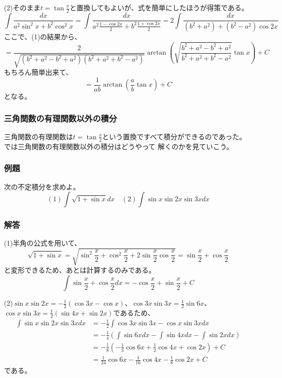 \documentclass[a4j,dvipdfmx]{jsarticle}
\begin{document}
(2)そのまま$t=\tan\frac{x}{2}$と置換してもよいが、式を簡単にしたほうが得策である。
\begin{equation*}
    \int \frac{dx}{a^2\sin^2 x+b^2\cos^2 x}=\int\frac{dx}{a^2\frac{1-\cos 2x}{2}+b^2\frac{1+\cos 2x}{2}}=2\int\frac{dx}{(b^2+a^2)+(b^2-a^2)\cos2x}
\end{equation*}
ここで、(1)の結果から、
\begin{equation*}
    =\frac{2}{\sqrt{(b^2+a^2-b^2+a^2)(b^2+a^2+b^2-a^2)}}\arctan\left(\sqrt{\frac{b^2+a^2-b^2+a^2}{b^2+a^2+b^2-a^2}}\tan x\right)+C
\end{equation*}
もちろん簡単出来て、
\begin{equation*}
    =\frac{1}{ab}\arctan\left(\frac{a}{b}\tan x\right)+C
\end{equation*}
となる。
\newpage
\subsubsection{三角関数の有理関数以外の積分}
三角関数の有理関数は$t=\tan \frac{x}{2}$という置換ですべて積分ができるのであった。では三角関数の有理関数以外の積分はどうやって
解くのかを見ていこう。

\subsubsection*{例題}
次の不定積分を求めよ。
\begin{equation*}
    (1)\int \sqrt{1+\sin x}dx\quad (2)\int \sin x\sin 2x\sin 3xdx
\end{equation*}
\subsubsection*{解答}
(1)半角の公式を用いて、
\begin{equation*}
    \sqrt{1+\sin x}=\sqrt{\sin^2\frac{x}{2}+\cos^2\frac{x}{2}+2\sin\frac{x}{2}\cos\frac{x}{2}}=\sin \frac{x}{2}+\cos \frac{x}{2}
\end{equation*}
と変形できるため、あとは計算するのみである。
\begin{equation*}
    \int \sin \frac{x}{2}+\cos \frac{x}{2} dx= -\cos \frac{x}{2}+\sin \frac{x}{2}+C
\end{equation*}

(2)$\sin x\sin 2x=-\frac{1}{2}(\cos 3x -\cos x)$、$\cos 3x\sin 3x=\frac{1}{2}\sin 6x$、$\cos x\sin 3x=\frac{1}{2}(\sin 4x+\sin 2x)$であるため、
\begin{align*}
    \int \sin x\sin 2x\sin 3xdx&=-\frac{1}{2}\int\cos 3x\sin 3x-\cos x\sin 3xdx\\
    &=-\frac{1}{4}(\int\sin 6xdx -\int\sin 4xdx-\int\sin 2xdx)\\
    &=-\frac{1}{8}(-\frac{1}{3}\cos 6x+\frac{1}{2}\cos 4x+\cos 2x)+C\\
    &=\frac{1}{24}\cos 6x-\frac{1}{16}\cos 4x-\frac{1}{8}\cos 2x+C
\end{align*}
である。
\newpage
\end{document}
